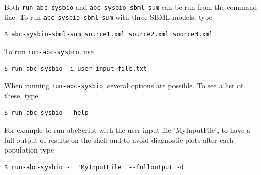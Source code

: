 \documentclass[a4paper]{report}
\begin{document}
Both \verb$run-abc-sysbio$ and \verb$abc-sysbio-sbml-sum$ can be run from the command line. To run \verb$abc-sysbio-sbml-sum$ with three SBML models, type
\begin{verbatim}
$ abc-sysbio-sbml-sum source1.xml source2.xml source3.xml
\end{verbatim}
To run \verb$run-abc-sysbio$, use
\begin{verbatim}
$ run-abc-sysbio -i user_input_file.txt
\end{verbatim}
When running \verb$run-abc-sysbio$, several options are possible. To see a list of these, type
\begin{verbatim}
$ run-abc-sysbio --help
\end{verbatim}
For example to run abcScript with the user input file 'MyInputFile', to have a full output of results on the shell and to avoid diagnostic plots after each population type
\begin{verbatim}
$ run-abc-sysbio -i 'MyInputFile' --fulloutput -d
\end{verbatim}
\end{document}
